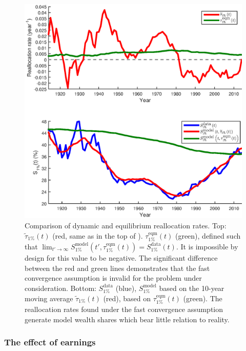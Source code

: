 \begin{figure}[!htb]
\centering
\includegraphics[width=1.0\textwidth] {./chapter_3/figs/tau_eqm_top1.eps}
\caption{Comparison of dynamic and equilibrium reallocation rates. Top: $\widetilde{\tau}_{1\%}\left(t\right)$ (red, same as in the top of ). $\tau^\text{eqm}_{1\%}\left(t\right)$ (green), defined such that $\lim_{t'\to\infty} S^{\text{model}}_{1\%}\left(t',\tau^\text{eqm}_{1\%}\left(t\right)\right)=S^{\text{data}}_{1\%}\left(t\right)$. It is impossible by design for this value to be negative. The significant difference between the red and green lines demonstrates that the fast convergence assumption is invalid for the problem under consideration. Bottom: $S^{\text{data}}_{1\%}$ (blue), $S^{\text{model}}_{1\%}$ based on the 10-year moving average $\widetilde{\tau}_{1\%}\left(t\right)$ (red), based on $\tau^\text{eqm}_{1\%}\left(t\right)$ (green). The reallocation rates found under the fast convergence assumption generate model wealth shares which bear little relation to reality.}
\end{figure}

\subsubsection{The effect of earnings}\label{sec:earnings}

